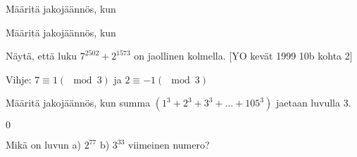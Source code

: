 \setcounter{tehtava}{0}

\begin{tehtavasivu}

\begin{tehtava}
  Määritä jakojäännös, kun
  \begin{alakohdat}
  \end{alakohdat}
  \begin{vastaus}
  \begin{alakohdat}
  \end{alakohdat}
  \end{vastaus}
\end{tehtava}


\begin{tehtava}
  Määritä jakojäännös, kun
  \begin{alakohdat}
  \end{alakohdat}
  \begin{vastaus}
  \begin{alakohdat}
  \end{alakohdat}
  \end{vastaus}
\end{tehtava}

\begin{tehtava}
  Näytä, että luku $7^{2502} + 2^{1573}$ on jaollinen kolmella. [YO kevät 1999 10b kohta 2]
  \begin{vastaus}
  Vihje: $7 \equiv 1 (\mod{3})$ ja $2 \equiv -1 (\mod{3})$
  \end{vastaus}
\end{tehtava}

\begin{tehtava}
  Määritä jakojäännös, kun summa $(1^3 + 2^3 + 3^3 + \ldots + 105^3)$ jaetaan luvulla $3$.
  \begin{vastaus}
  $0$
  \end{vastaus}
\end{tehtava}

\begin{tehtava}
  Mikä on luvun a) $2^{77}$ b) $3^{33}$ viimeinen numero?
  \begin{vastaus}
  \begin{alakohdat}
  \end{alakohdat}
  \end{vastaus}
\end{tehtava}


\end{tehtavasivu}
